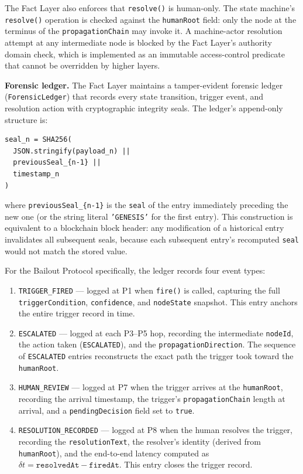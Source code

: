 \documentclass[12pt]{article}
\begin{document}
The Fact Layer also enforces that \texttt{resolve()} is human-only. The state machine's \texttt{resolve()} operation is checked against the \texttt{humanRoot} field: only the node at the terminus of the \texttt{propagationChain} may invoke it. A machine-actor resolution attempt at any intermediate node is blocked by the Fact Layer's authority domain check, which is implemented as an immutable access-control predicate that cannot be overridden by higher layers.

\bigskip
\noindent\textbf{Forensic ledger.} The Fact Layer maintains a tamper-evident forensic ledger (\texttt{ForensicLedger}) that records every state transition, trigger event, and resolution action with cryptographic integrity seals. The ledger's append-only structure is:

\begin{verbatim}
seal_n = SHA256(
  JSON.stringify(payload_n) ||
  previousSeal_{n-1} ||
  timestamp_n
)
\end{verbatim}

where \texttt{previousSeal\_\{n-1\}} is the \texttt{seal} of the entry immediately preceding the new one (or the string literal \texttt{'GENESIS'} for the first entry). This construction is equivalent to a blockchain block header: any modification of a historical entry invalidates all subsequent seals, because each subsequent entry's recomputed \texttt{seal} would not match the stored value.

For the Bailout Protocol specifically, the ledger records four event types:

\begin{enumerate}
  \item \texttt{TRIGGER\_FIRED} --- logged at P1 when \texttt{fire()} is called, capturing the full \texttt{triggerCondition}, \texttt{confidence}, and \texttt{nodeState} snapshot. This entry anchors the entire trigger record in time.

  \item \texttt{ESCALATED} --- logged at each P3--P5 hop, recording the intermediate \texttt{nodeId}, the action taken (\texttt{ESCALATED}), and the \texttt{propagationDirection}. The sequence of \texttt{ESCALATED} entries reconstructs the exact path the trigger took toward the \texttt{humanRoot}.

  \item \texttt{HUMAN\_REVIEW} --- logged at P7 when the trigger arrives at the \texttt{humanRoot}, recording the arrival timestamp, the trigger's \texttt{propagationChain} length at arrival, and a \texttt{pendingDecision} field set to \texttt{true}.

  \item \texttt{RESOLUTION\_RECORDED} --- logged at P8 when the human resolves the trigger, recording the \texttt{resolutionText}, the resolver's identity (derived from \texttt{humanRoot}), and the end-to-end latency computed as $\delta t = \texttt{resolvedAt} - \texttt{firedAt}$. This entry closes the trigger record.
\end{enumerate}
\end{document}
